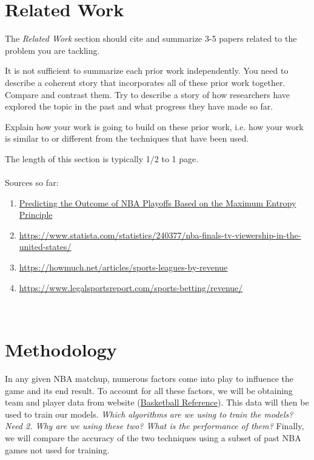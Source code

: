 \documentclass[letterpaper]{article} %
\begin{document}

\section{Related Work}

The {\it Related Work} section should cite and summarize 3-5 papers related to the problem you are tackling.   


It is not sufficient to summarize each prior work independently.  You need to describe a coherent story that incorporates all of these prior work together.  Compare and contrast them.  Try to describe a story of how researchers have explored the topic in the past and what progress they have made so far.  

Explain how your work is going to build on these prior work, i.e. how your work is similar to or different from the techniques that have been used.  

The length of this section is typically 1/2 to 1 page.
\\ \\
Sources so far:
\\
\begin{enumerate}
\item
\href{https://www.researchgate.net/publication/312236952_Predicting_the_Outcome_of_NBA_Playoffs_Based_on_the_Maximum_Entropy_Principle}{Predicting the Outcome of NBA Playoffs Based on the Maximum Entropy Principle}

\item \href{https://www.statista.com/statistics/240377/nba-finals-tv-viewership-in-the-united-states/}{https://www.statista.com/statistics/240377/nba-finals-tv-viewership-in-the-united-states/}
\item \href{https://howmuch.net/articles/sports-leagues-by-revenue}{https://howmuch.net/articles/sports-leagues-by-revenue}
\item \href{https://www.legalsportsreport.com/sports-betting/revenue/}{https://www.legalsportsreport.com/sports-betting/revenue/}

\end{enumerate}
\

\section{Methodology}

In any given NBA matchup, numerous factors come into play to influence the game and its end result. To account for all these factors, we will be obtaining team and player data from website (\href{https://www.basketball-reference.com/}{Basketball Reference}). This data will then be used to train our models. { \it Which algorithms are we using to train the models? Need 2. Why are we using these two? What is the performance of them? }  Finally, we will compare the accuracy of the two techniques using a subset of past NBA games not used for training.
\end{document}
